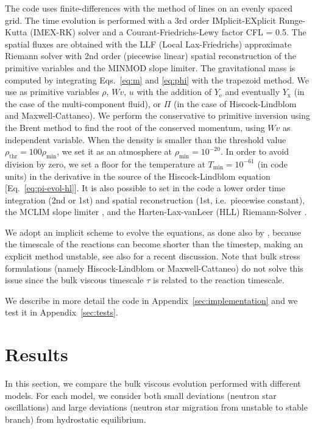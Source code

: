 \documentclass[aps,prd,twocolumn,a4paper,floatfix,nofootbib,superscriptaddress,nofootinbib]{revtex4}
\begin{document}
The code uses finite-differences with the method of lines on an evenly spaced
grid.  The time evolution is performed with a 3rd order IMplicit-EXplicit
Runge-Kutta (IMEX-RK) solver \cite{Pareschi10} and a Courant-Friedrichs-Lewy factor CFL = 0.5.  The spatial
fluxes are obtained with the LLF (Local Lax-Friedrichs) approximate Riemann solver \cite{Lax54} with 2nd order
(piecewise linear) spatial reconstruction of the primitive variables and the
MINMOD slope limiter.  The gravitational mass is computed by
integrating Eqs.~\eqref{eq:m} and \eqref{eq:phi} with the trapezoid method.
We use as primitive variables $\rho$, $Wv$, $u$ with the
addition of $Y_\mathrm{e}$ and eventually $Y_\mathrm{x}$ (in the case of the
multi-component fluid), or $\Pi$ (in the case of Hiscock-Lindblom and
Maxwell-Cattaneo).  We perform the conservative to primitive inversion using
the Brent method to find the root of the conserved momentum, using $Wv$ as
independent variable. When the density is smaller than the threshold value
$\rho_\mathrm{thr}=100\rho_\mathrm{min}$, we set it as an atmosphere at
$\rho_\mathrm{min}=10^{-20}$.
In order to avoid division by zero, we set a floor for the temperature at
$T_\mathrm{min}=10^{-61}$ (in code units) in the derivative in the source of
the Hiscock-Lindblom equation [Eq.~\eqref{eq:pi-evol-hl}].  It is also possible to set in the code
a lower order time integration (2nd or 1st) and spatial reconstruction
(1st, i.e.~piecewise constant), the MCLIM slope limiter \cite{vanLeer77}, and the Harten-Lax-vanLeer (HLL)
Riemann-Solver \cite{Harten83}.

We adopt an implicit scheme to evolve the equations, as done also by \citet{MostNoronha21}, because the timescale of
the reactions can become shorter than the timestep, making an explicit method
unstable, see also \citep{celora22arxiv} for a recent discussion. 
Note that bulk stress formulations (namely Hiscock-Lindblom or
Maxwell-Cattaneo) do not solve this issue since the bulk viscous timescale
$\tau$ is related to the reaction timescale.

We describe in more detail the code in Appendix~\ref{sec:implementation} and
we test it in Appendix~\ref{sec:tests}.

\section{Results}
\label{sec:results}

In this section, we compare the bulk viscous evolution performed with different
models.  For each model, we consider both small deviations (neutron star
oscillations) and large deviations (neutron star migration from unstable to
stable branch) from hydrostatic equilibrium. 
\end{document}
